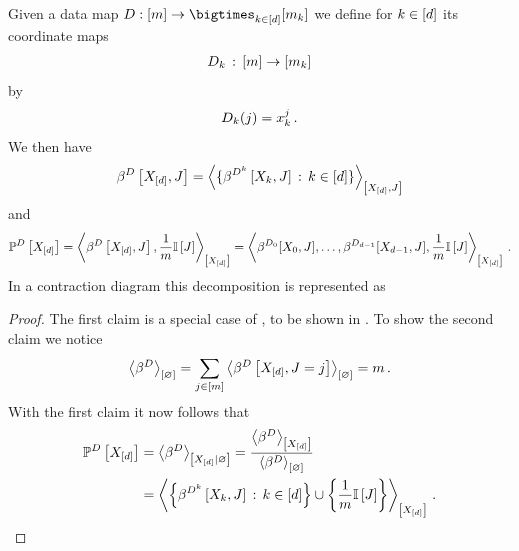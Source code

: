 \begin{theorem}
    \label{the:empCPRep}
    Given a data map $\datamap: [\datanum] \rightarrow \facstates$ we define for $k\in[d]$ its coordinate maps
    \begin{align*}
        D_{k} \,:\, [m] \rightarrow [m_{k}]
    \end{align*}
    by
    \begin{align*}
        D_{k}(j) = x_{k}^j \, .
    \end{align*}
    We then have
    \begin{align*}
        \bencodingofat{\datamap}{\shortcatvariables,\datvariable}
        = \contractionof{
            \{\bencodingofat{\datamap^{\atomenumerator}}{\catvariableof{\atomenumerator},\datvariable} \wcols \atomenumeratorin \}
        }{\shortcatvariables,\datvariable}
    \end{align*}
    and
    \begin{align*}
        \mathbb{P}^{D}\left[X_{[d]}\right]
        = \left\langle \beta^{D}\left[X_{[d]},J\right], \frac{1}{m}\mathbb{I}\left[J\right]\right\rangle_{\left[ X_{[d]} \right]}
        = \left\langle \beta^{D_{0}}[X_{0},J],\ldots,\beta^{D_{d-1}}[X_{d-1},J],\frac{1}{m}\mathbb{I}\left[J\right]\right\rangle_{\left[ X_{[d]} \right]} \, .
    \end{align*}
    In a contraction diagram this decomposition is represented as
    \begin{center}
        
    \end{center}
\end{theorem}
\begin{proof}
    The first claim is a special case of , to be shown in .
    To show the second claim we notice
    \[ \contraction{\datacore} = \sum_{\datindexin} \contraction{\bencodingofat{\datamap}{\shortcatvariables,\datvariable=\datindex}} = \datanum \,  . \]
    With the first claim it now follows that
    \begin{align*}
        \empdistributionat{\shortcatvariables}
        &= \normalizationof{\datacore}{\shortcatvariables}
        = \frac{\contractionof{\datacore}{\shortcatvariables}}{\contraction{\datacore}} \\
        &=  \contractionof{
            \left\{\bencodingofat{\datamap^{\atomenumerator}}{\catvariableof{\atomenumerator},\datvariable}\wcols\atomenumeratorin \right\} \cup \left\{\frac{1}{\datanum}\onesat{\datvariable}\right\}
        }{\shortcatvariables}  \, . \qedhere
    \end{align*}
\end{proof}


